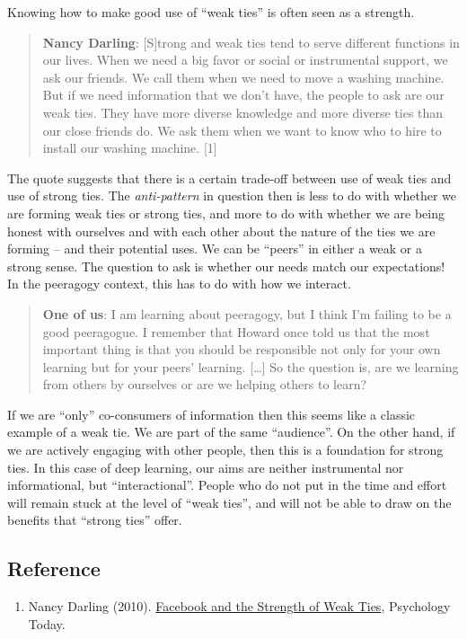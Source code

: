 Knowing how to make good use of ``weak ties'' is often seen as a
strength.

\begin{quote}
\textbf{Nancy Darling}: {[}S{]}trong and weak ties tend to serve
different functions in our lives. When we need a big favor or social or
instrumental support, we ask our friends. We call them when we need to
move a washing machine. But if we need information that we don't have,
the people to ask are our weak ties. They have more diverse knowledge
and more diverse ties than our close friends do. We ask them when we
want to know who to hire to install our washing machine. {[}1{]}
\end{quote}
The quote suggests that there is a certain trade-off between use of weak
ties and use of strong ties. The \emph{anti-pattern} in question then is
less to do with whether we are forming weak ties or strong ties, and
more to do with whether we are being honest with ourselves and with each
other about the nature of the ties we are forming -- and their potential
uses. We can be ``peers'' in either a weak or a strong sense. The
question to ask is whether our needs match our expectations! In the
peeragogy context, this has to do with how we interact.

\begin{quote}
\textbf{One of us}: I am learning about peeragogy, but I think I'm
failing to be a good peeragogue. I remember that Howard once told us
that the most important thing is that you should be responsible not only
for your own learning but for your peers' learning. {[}\ldots{}{]} So
the question is, are we learning from others by ourselves or are we
helping others to learn?
\end{quote}
If we are ``only'' co-consumers of information then this seems like a
classic example of a weak tie. We are part of the same ``audience''. On
the other hand, if we are actively engaging with other people, then this
is a foundation for strong ties. In this case of deep learning, our aims
are neither instrumental nor informational, but ``interactional''.
People who do not put in the time and effort will remain stuck at the
level of ``weak ties'', and will not be able to draw on the benefits
that ``strong ties'' offer.

\subsection{Reference}

\begin{enumerate}
\item
  Nancy Darling (2010).
  \href{http://www.psychologytoday.com/blog/thinking-about-kids/201005/facebook-and-the-strength-weak-ties}{Facebook
  and the Strength of Weak Ties}, Psychology Today.
\end{enumerate}
